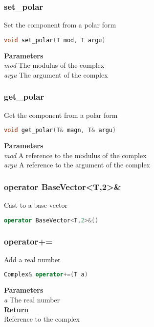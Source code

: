 \subsubsection{set\_polar}
\begin{mdframed}
Set the component from a polar form
\begin{lstlisting}[language=C++]
void set_polar(T mod, T argu)
\end{lstlisting}
\textbf{Parameters} \\ 
\textit{mod} The modulus of the complex \\ 
\textit{argu} The argument of the complex \\ 
\end{mdframed}

\subsubsection{get\_polar}
\begin{mdframed}
Get the component from a polar form
\begin{lstlisting}[language=C++]
void get_polar(T& magn, T& argu)
\end{lstlisting}
\textbf{Parameters} \\ 
\textit{mod} A reference to the modulus of the complex \\ 
\textit{argu} A reference to the argument of the complex \\ 
\end{mdframed}

\subsubsection{operator BaseVector<T,2>\&}
\begin{mdframed}
Cast to a base vector
\begin{lstlisting}[language=C++]
operator BaseVector<T,2>&()
\end{lstlisting}
\end{mdframed}

\subsubsection{operator+=}
\begin{mdframed}
Add a real number
\begin{lstlisting}[language=C++]
Complex& operator+=(T a)
\end{lstlisting}
\textbf{Parameters} \\ 
\textit{a} The real number \\ 
\textbf{Return} \\ 
Reference to the complex\\ 
\end{mdframed}

